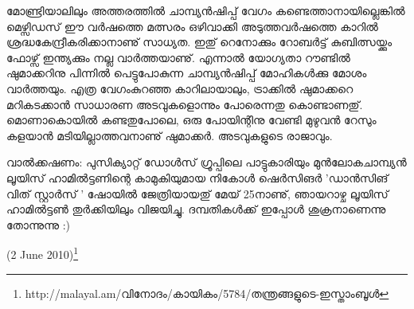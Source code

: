 മോണ്ട്രിയാലിലും അത്തരത്തില്‍ ചാമ്പ്യന്‍ഷിപ്പ് വേഗം കണ്ടെത്താനായില്ലെങ്കില്‍ മെഴ്സിഡസ് ഈ വര്‍ഷത്തെ മത്സരം 
ഒഴിവാക്കി അടുത്തവര്‍ഷത്തെ കാറില്‍ ശ്രദ്ധകേന്ദ്രീകരിക്കാനാണു് സാധ്യത. ഇതു് റെനോക്കും റോബര്‍ട്ട് കുബിത്സയ്ക്കും 
ഫോഴ്സ് ഇന്ത്യക്കും നല്ല വാര്‍ത്തയാണു്. എന്നാല്‍ യോഗ്യതാ റൗണ്ടില്‍ ഷുമാക്കറിനു പിന്നില്‍ പെട്ടുപോകുന്ന 
ചാമ്പ്യന്‍ഷിപ്പ് മോഹികള്‍ക്കു മോശം വാര്‍ത്തയും. എത്ര വേഗംകുറഞ്ഞ കാറിലായാലും, ട്രാക്കില്‍ ഷുമാക്കറെ മറികടക്കാന്‍
സാധാരണ അടവുകളൊന്നും പോരെന്നതു കൊണ്ടാണതു്. മൊണാകൊയില്‍ കണ്ടതുപോലെ, ഒരു പോയിന്റിനു വേണ്ടി 
മുഴുവന്‍ റേസും കളയാന്‍ മടിയില്ലാത്തവനാണു് ഷുമാക്കര്‍. അടവുകളുടെ രാജാവും.

വാല്‍ക്കഷണം: പുസിക്യാറ്റ് ഡോള്‍സ് ഗ്രൂപ്പിലെ പാട്ടുകാരിയും മുന്‍ലോകചാമ്പ്യന്‍ ലൂയിസ് ഹാമില്‍ട്ടണിന്റെ 
കാമുകിയുമായ നികോള്‍ ഷെര്‍സിങര്‍ 'ഡാന്‍സിങ് വിത് സ്റ്റാര്‍സ് ' ഷോയില്‍ ജേത്രിയായതു് മേയ് 25നാണു്, 
ഞായറാഴ്ച ലൂയിസ് ഹാമില്‍ട്ടണ്‍ തുര്‍ക്കിയിലും വിജയിച്ചു. ദമ്പതികള്‍ക്ക് ഇപ്പോള്‍ ശുക്രനാണെന്നു തോന്നുന്നു :)

(2 June 2010)\footnote{http://malayal.am/വിനോദം/കായികം/5784/തന്ത്രങ്ങളുടെ-ഇസ്താംബൂള്‍}

\newpage
